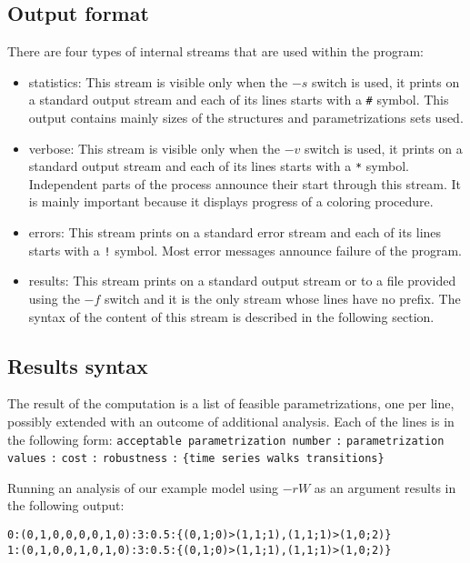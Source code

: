 \documentclass[12pt]{article}
\begin{document}
\subsection{Output format}
There are four types of internal streams that are used within the program:
\begin{itemize}
\item statistics: This stream is visible only when the $-s$ switch is used, it prints on a standard output stream and each of its lines starts with a \texttt{\#} symbol. This output contains mainly sizes of the structures and parametrizations sets used.
\item verbose: This stream is visible only when the $-v$ switch is used, it prints on a standard output stream and each of its lines starts with a \texttt{*} symbol. Independent parts of the process announce their start through this stream. It is mainly important because it displays progress of a coloring procedure.
\item errors: This stream prints on a standard error stream and each of its lines starts with a \texttt{!} symbol. Most error messages announce failure of the program.
\item results: This stream prints on a standard output stream or to a file provided using the $-f$ switch and it is the only stream whose lines have no prefix. The syntax of the content of this stream is described in the following section.
\end{itemize}

\subsection{Results syntax}
The result of the computation is a list of feasible parametrizations, one per line, possibly extended with an outcome of additional analysis. Each of the lines is in the following form: 
\texttt{ac\-cept\-able pa\-ra\-met\-riz\-a\-tion num\-ber}
\texttt{:}
\texttt{pa\-ra\-met\-riz\-a\-tion values}
\texttt{:}
\texttt{cost}
\texttt{:}
\texttt{ro\-bust\-ness}
\texttt{:}
\texttt{\{time se\-ries walks tran\-si\-tions\}}

Running an analysis of our example model using $-rW$ as an argument results in the following output:
\begin{alltt}
0:(0,1,0,0,0,0,1,0):3:0.5:\{(0,1;0)>(1,1;1),(1,1;1)>(1,0;2)\}
1:(0,1,0,0,1,0,1,0):3:0.5:\{(0,1;0)>(1,1;1),(1,1;1)>(1,0;2)\}
\end{alltt}
\end{document}
